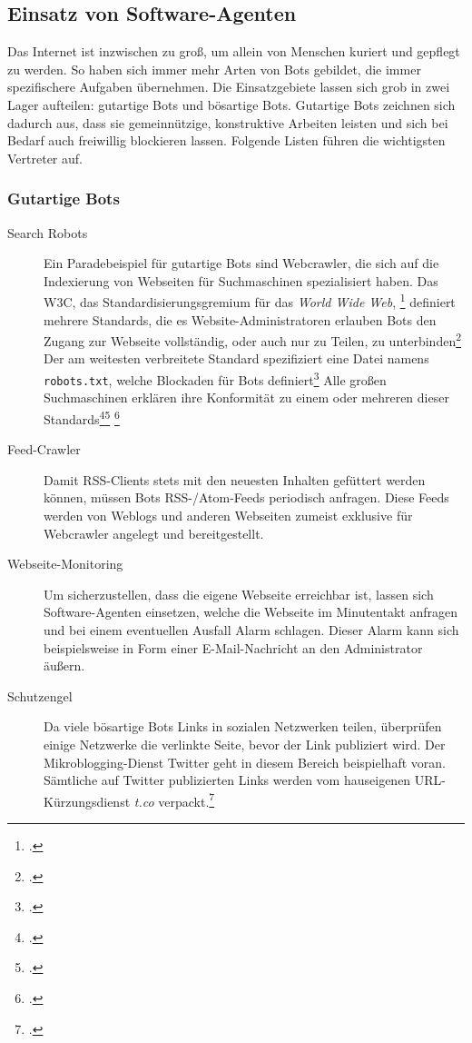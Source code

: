 \subsection{Einsatz von Software-Agenten}
\label{sub:einsatz-von-software-agenten}

Das Internet ist inzwischen zu groß, um allein von Menschen kuriert und
gepflegt zu werden. So haben sich immer mehr Arten von Bots gebildet, die immer
spezifischere Aufgaben übernehmen. Die Einsatzgebiete lassen sich grob in zwei
Lager aufteilen: gutartige Bots und bösartige Bots. Gutartige Bots zeichnen
sich dadurch aus, dass sie gemeinnützige, konstruktive Arbeiten leisten und
sich bei Bedarf auch freiwillig blockieren lassen. Folgende Listen führen die
wichtigsten Vertreter auf.

\subsubsection{Gutartige Bots}
\label{ssub:gutartige-bots}

\begin{description}
  \item[Search Robots]
  Ein Paradebeispiel für gutartige Bots sind Webcrawler, die sich auf die
  Indexierung von Webseiten für Suchmaschinen spezialisiert haben. Das W3C, das
  Standardisierungsgremium für das \emph{World Wide Web},
  \footcite{w3c:standards} definiert mehrere Standards, die es
  Website-Administratoren erlauben Bots den Zugang zur Webseite vollständig,
  oder auch nur zu Teilen, zu unterbinden\footcite{w3c:searchBots}
  \label{robotstxt} Der am weitesten verbreitete Standard spezifiziert eine
  Datei namens \texttt{robots.txt}, welche Blockaden für Bots
  definiert\footcite{w3c:robotsTxt} Alle großen Suchmaschinen erklären ihre
  Konformität zu einem oder mehreren dieser
  Standards\footcite{robotsTagGoogle}\footcite{yandexUsingRobotsTxt}
  \footcite{duckduckgoBot}
  
  \item[Feed-Crawler]
  Damit RSS-Clients stets mit den neuesten Inhalten gefüttert werden können,
  müssen Bots RSS-/Atom-Feeds periodisch anfragen. Diese Feeds werden von
  Weblogs und anderen Webseiten zumeist exklusive für Webcrawler angelegt und
  bereitgestellt.
  
  \item[Webseite-Monitoring]
  Um sicherzustellen, dass die eigene Webseite erreichbar ist, lassen sich
  Software-Agenten einsetzen, welche die Webseite im Minutentakt anfragen und
  bei einem eventuellen Ausfall Alarm schlagen. Dieser Alarm kann sich
  beispielsweise in Form einer E-Mail-Nachricht an den Administrator äußern.
  
  \item[Schutzengel]
  Da viele bösartige Bots Links in sozialen Netzwerken teilen, überprüfen
  einige Netzwerke die verlinkte Seite, bevor der Link publiziert wird. Der
  Mikroblogging-Dienst Twitter geht in diesem Bereich beispielhaft voran.
  Sämtliche auf Twitter publizierten Links werden vom hauseigenen
  URL-Kürzungsdienst \emph{t.co} verpackt.\footcite{twitterShortLink}
\end{description}

